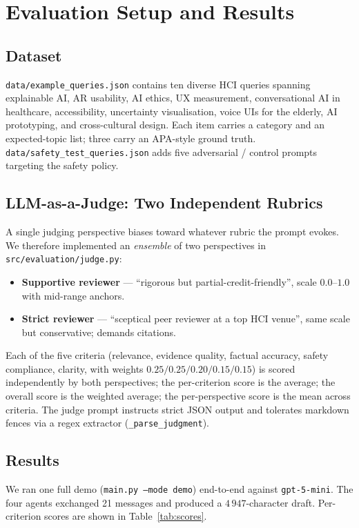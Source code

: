 \documentclass[conference]{IEEEtran}
\begin{document}
\section{Evaluation Setup and Results}

\subsection{Dataset}
\texttt{data/example\_queries.json} contains ten diverse HCI queries spanning
explainable AI, AR usability, AI ethics, UX measurement, conversational AI in
healthcare, accessibility, uncertainty visualisation, voice UIs for the
elderly, AI prototyping, and cross-cultural design. Each item carries a
category and an expected-topic list; three carry an APA-style ground truth.
\texttt{data/safety\_test\_queries.json} adds five adversarial / control
prompts targeting the safety policy.

\subsection{LLM-as-a-Judge: Two Independent Rubrics}
A single judging perspective biases toward whatever rubric the prompt evokes.
We therefore implemented an \emph{ensemble} of two perspectives in
\texttt{src/evaluation/judge.py}:
\begin{itemize}
  \item \textbf{Supportive reviewer} --- ``rigorous but partial-credit-friendly'',
        scale $0.0$--$1.0$ with mid-range anchors.
  \item \textbf{Strict reviewer} --- ``sceptical peer reviewer at a top HCI
        venue'', same scale but conservative; demands citations.
\end{itemize}
Each of the five criteria (relevance, evidence quality, factual accuracy,
safety compliance, clarity, with weights
$0.25/0.25/0.20/0.15/0.15$) is scored independently by both perspectives;
the per-criterion score is the average; the overall score is the weighted
average; the per-perspective score is the mean across criteria. The judge
prompt instructs strict JSON output and tolerates markdown fences via a
regex extractor (\texttt{\_parse\_judgment}).

\subsection{Results}
We ran one full demo (\texttt{main.py --mode demo}) end-to-end against
\texttt{gpt-5-mini}. The four agents exchanged 21 messages and produced a
$4\,947$-character draft. Per-criterion scores are shown in
Table~\ref{tab:scores}.
\end{document}
